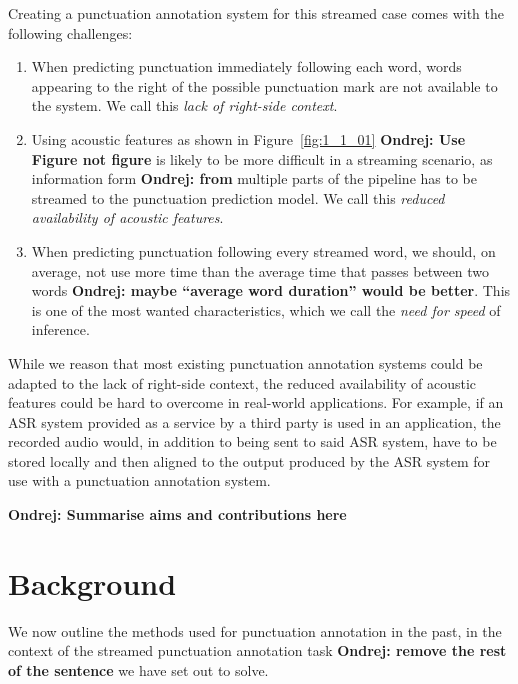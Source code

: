 \documentclass[bsc,deptreport,ai]{infthesis} %
\newcommand{\Ondrej}[1]{{\color{red} \textbf{Ondrej: #1}}}
\begin{document}
 Creating a punctuation annotation system for this streamed case comes with the following challenges:
\begin{enumerate}
    \item When predicting punctuation immediately following each word, words appearing to the right of the possible punctuation mark are not available to the system. We call this \emph{lack of right-side context}.
    \item Using acoustic features as shown in Figure~\ref{fig:1_1_01}\Ondrej{Use Figure not figure} is likely to be more difficult in a streaming scenario, as information form\Ondrej{from} multiple parts of the pipeline has to be streamed to the punctuation prediction model. We call this \emph{reduced availability of acoustic features}.
    \item When predicting punctuation following every streamed word, we should, on average, not use more time than the average time that passes between two words\Ondrej{maybe ``average word duration'' would be better}. This is one of the most wanted characteristics, which we call the \emph{need for speed} of inference.
\end{enumerate}
While we reason that most existing punctuation annotation systems could be adapted to the lack of right-side context, the reduced availability of acoustic features could be hard to overcome in real-world applications. For example, if an ASR system provided as a service by a third party is used in an application, the recorded audio would, in addition to being sent to said ASR system, have to be stored locally and then aligned to the output produced by the ASR system for use with a punctuation annotation system.

\Ondrej{Summarise aims and contributions here}

\chapter{Background}

We now outline the methods used for punctuation annotation in the past, in the context of the streamed punctuation annotation task\Ondrej{remove the rest of the sentence} we have set out to solve.
\end{document}
